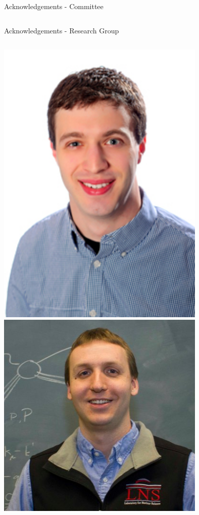 \documentclass[aspectratio=169]{beamer}
\begin{document}
\begin{frame}{Acknowledgements - Committee}
\begin{columns}
    \end{columns}            
\end{frame}

\begin{frame}{Acknowledgements - Research Group}
    \begin{columns}
            \includegraphics[width=0.75\textwidth]{people/actual_mrg/charles.png}
            \includegraphics[width=0.75\textwidth]{people/actual_mrg/axel.png}
            

\end{columns}
\end{frame}
\end{document}
